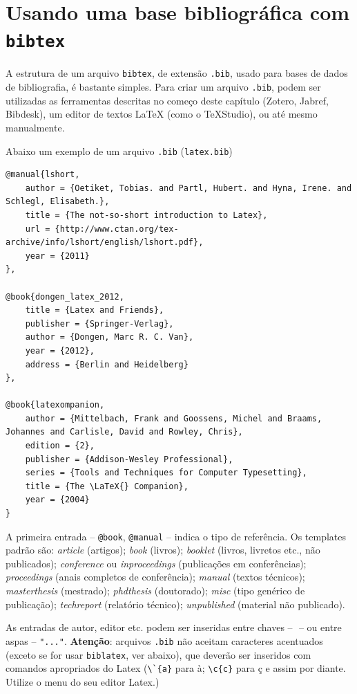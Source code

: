 \section{Usando uma base bibliográfica com \texttt{bibtex}}
\label{bibtex}

A estrutura de um arquivo \texttt{bibtex}, de extensão \texttt{.bib}, usado para bases de dados de bibliografia, é bastante simples. Para criar um arquivo \texttt{.bib}, podem ser utilizadas as ferramentas descritas no começo deste capítulo (Zotero, Jabref, Bibdesk), um editor de textos \LaTeX{} (como o TeXStudio), ou até mesmo manualmente.

Abaixo um exemplo de um arquivo \texttt{.bib} (\texttt{latex.bib}) \label{latex-bib}

\begin{verbatim}
@manual{lshort,
    author = {Oetiket, Tobias. and Partl, Hubert. and Hyna, Irene. and Schlegl, Elisabeth.},
    title = {The not-so-short introduction to Latex},
    url = {http://www.ctan.org/tex-archive/info/lshort/english/lshort.pdf},
    year = {2011}
},

@book{dongen_latex_2012,
	title = {Latex and Friends},
	publisher = {Springer-Verlag},
	author = {Dongen, Marc R. C. Van},
	year = {2012},
	address = {Berlin and Heidelberg}
},

@book{latexompanion,
    author = {Mittelbach, Frank and Goossens, Michel and Braams, Johannes and Carlisle, David and Rowley, Chris},
    edition = {2},
    publisher = {Addison-Wesley Professional},
    series = {Tools and Techniques for Computer Typesetting},
    title = {The \LaTeX{} Companion},
    year = {2004}
}

\end{verbatim}

A primeira entrada -- \verb+@book+, \verb+@manual+ -- indica o tipo de referência. Os templates padrão são: \textit{article} (artigos); \textit{book} (livros); \textit{booklet} (livros, livretos etc., não publicados); \textit{conference} ou \textit{inproceedings} (publicações em conferências); \textit{proceedings} (anais completos de conferência); \textit{manual} (textos técnicos); \textit{masterthesis} (mestrado); \textit{phdthesis} (doutorado); \textit{misc} (tipo genérico de publicação); \textit{techreport} (relatório técnico); \textit{unpublished} (material não publicado).

As entradas de autor, editor etc. podem ser inseridas entre chaves -- ${}$ -- ou entre aspas -- \verb+"..."+. 
\textbf{Atenção}: arquivos \texttt{.bib} não aceitam caracteres acentuados (exceto se for usar \texttt{biblatex}, ver abaixo), que deverão ser inseridos com comandos apropriados do Latex (\verb+\`{a}+ para à; \verb+\c{c}+ para ç e assim por diante. Utilize o menu do seu editor Latex.)

